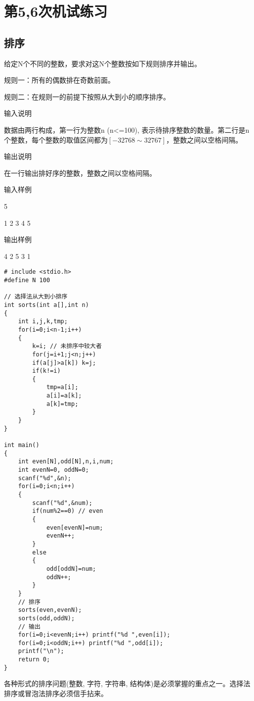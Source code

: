 %
%
%
\chapter{第5,6次机试练习}

\section{排序}	
给定N个不同的整数，要求对这N个整数按如下规则排序并输出。

规则一：所有的偶数排在奇数前面。

规则二：在规则一的前提下按照从大到小的顺序排序。

输入说明	

数据由两行构成，第一行为整数n (n<=100), 表示待排序整数的数量。第二行是n个整数，每个整数的取值区间都为$[-32768\sim32767]$，整数之间以空格间隔。

输出说明
	
在一行输出排好序的整数，整数之间以空格间隔。

输入样例	

5 

1 2 3 4 5

输出样例
	
4 2 5 3 1

\begin{lstlisting}
# include <stdio.h>
#define N 100

// 选择法从大到小排序 
int sorts(int a[],int n)
{
	int i,j,k,tmp;
	for(i=0;i<n-1;i++)
	{
		k=i; // 未排序中较大者 
		for(j=i+1;j<n;j++)
		if(a[j]>a[k]) k=j;
		if(k!=i)
		{
			tmp=a[i];
			a[i]=a[k];
			a[k]=tmp;
		} 
	}
}

int main()
{
	int even[N],odd[N],n,i,num;
	int evenN=0, oddN=0;
	scanf("%d",&n);
	for(i=0;i<n;i++)
	{
		scanf("%d",&num);
		if(num%2==0) // even
		{
			even[evenN]=num;
			evenN++;
		}
		else
		{
			odd[oddN]=num;
			oddN++;
		}
	} 
	// 排序
	sorts(even,evenN);
	sorts(odd,oddN);
	// 输出 
	for(i=0;i<evenN;i++) printf("%d ",even[i]); 
	for(i=0;i<oddN;i++) printf("%d ",odd[i]); 
	printf("\n"); 
	return 0;
}
\end{lstlisting}

\begin{note}[要点]
	各种形式的排序问题(整数, 字符, 字符串, 结构体)是必须掌握的重点之一。选择法排序或冒泡法排序必须信手拈来。
\end{note}

